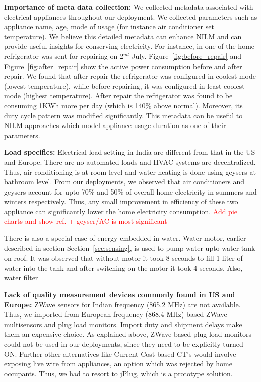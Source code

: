\documentclass[10pt]{sensys-proc}
\newcommand{\redcolor}[1]{\textcolor{red}{#1}}
\newcommand{\figref}[1]{Figure~\ref{#1}}
\newcommand{\secref}[1]{Section~\ref{#1}}
\begin{document}
\noindent \textbf{Importance of meta data collection:} We collected metadata associated with electrical appliances throughout our deployment. We collected parameters such as appliance name, age, mode of usage (for instance air conditioner set temperature). We believe this detailed metadata can enhance NILM and can provide useful insights for conserving electricity. For instance, in one of the home refrigerator was sent for repairing on 2$^{nd}$ July. \figref{fig:before_repair} and \figref{fig:after_repair} show the active power consumption before and after repair. We found that after repair the refrigerator was configured in coolest mode (lowest temperature), while before repairing, it was configured in least coolest mode (highest temperature). After repair the refrigerator was found to be consuming 1KWh more per day (which is 140\% above normal). Moreover, its duty cycle pattern was modified significantly. This metadata can be useful to NILM approaches which model appliance usage duration as one of their parameters.

\noindent \textbf{Load specifics:} Electrical load setting in India are different from that in the US and Europe. There are no automated loads and HVAC systems are decentralized. Thus, air conditioning is at room level and water heating is done using geysers at bathroom level. From our deployments, we observed that air conditioners and geysers account for upto 70\% and 50\% of overall home electricity in summers and winters respectively. Thus, any small improvement in efficiency of these two appliance can significantly lower the home electricity consumption.
\redcolor{Add pie charts and show ref. + geyser/AC is most significant}

\noindent There is also a special case of energy embedded in water. Water motor, earlier described in section \secref{sec:sensing}, is used to pump water upto water tank on roof. It was observed that without motor it took 8 seconds to fill 1 liter of water into the tank and after switching on the motor it took 4 seconds. Also, water filter 

\noindent \textbf{Lack of quality measurement devices commonly found in US and Europe:} ZWave sensors for Indian frequency (865.2 MHz) are not available. Thus, we imported from European frequency (868.4 MHz) based ZWave multisensors and plug load monitors. Import duty and shipment delays make them an expensive choice. As explained above, ZWave based plug load monitors could not be used in our deployments, since they need to be explicitly turned ON. Further other alternatives like Current Cost based CT's would involve exposing live wire from appliances, an option which was rejected by home occupants. Thus, we had to resort to jPlug, which is a prototype solution.
\end{document}
